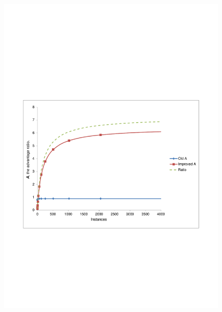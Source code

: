 \begin{figure}
  \centering
  \subfloat%
           {\includegraphics[scale=0.85, trim=5cm 8.5cm 5cm 10cm]{results1.pdf} \label{results1}} \\
  \subfloat%

\end{figure}
